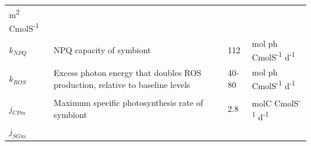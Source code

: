 \documentclass[]{elsarticle} %
\begin{document}
\begin{longtable}[c]{@{}llll@{}}
\begin{minipage}[t]{0.23\columnwidth}
m\textsuperscript{2} CmolS\textsuperscript{-1}
\strut\end{minipage}\tabularnewline
\begin{minipage}[t]{0.10\columnwidth}\raggedright\strut
\(k_{NPQ}\)
\strut\end{minipage} &
\begin{minipage}[t]{0.48\columnwidth}\raggedright\strut
NPQ capacity of symbiont
\strut\end{minipage} &
\begin{minipage}[t]{0.09\columnwidth}\raggedright\strut
112
\strut\end{minipage} &
\begin{minipage}[t]{0.23\columnwidth}\raggedright\strut
mol ph CmolS\textsuperscript{-1} d\textsuperscript{-1}
\strut\end{minipage}\tabularnewline
\begin{minipage}[t]{0.10\columnwidth}\raggedright\strut
\(k_{ROS}\)
\strut\end{minipage} &
\begin{minipage}[t]{0.48\columnwidth}\raggedright\strut
Excess photon energy that doubles ROS production, relative to baseline
levels
\strut\end{minipage} &
\begin{minipage}[t]{0.09\columnwidth}\raggedright\strut
40-80
\strut\end{minipage} &
\begin{minipage}[t]{0.23\columnwidth}\raggedright\strut
mol ph CmolS\textsuperscript{-1} d\textsuperscript{-1}
\strut\end{minipage}\tabularnewline
\begin{minipage}[t]{0.10\columnwidth}\raggedright\strut
\(j_{CPm}\)
\strut\end{minipage} &
\begin{minipage}[t]{0.48\columnwidth}\raggedright\strut
Maximum specific photosynthesis rate of symbiont
\strut\end{minipage} &
\begin{minipage}[t]{0.09\columnwidth}\raggedright\strut
2.8
\strut\end{minipage} &
\begin{minipage}[t]{0.23\columnwidth}\raggedright\strut
molC CmolS\textsuperscript{-1} d\textsuperscript{-1}
\strut\end{minipage}\tabularnewline
\begin{minipage}[t]{0.10\columnwidth}\raggedright\strut
\(j_{SGm}\)
\strut\end{minipage} &

\end{longtable}
\end{document}
